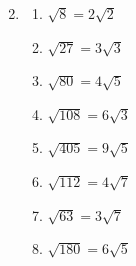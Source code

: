 \documentclass[a4paper,12pt]{article}
\begin{document}
\begin{enumerate}
\begin{multicols}{2}
	\end{multicols}
	\item 
	\begin{multicols}{2}
		\begin{enumerate}
			\item $\displaystyle \sqrt{8}=2\sqrt{2}$
			\item $\displaystyle \sqrt{27}=3\sqrt{3}$
			\item $\displaystyle \sqrt{80}=4\sqrt{5}$
			\item $\displaystyle \sqrt{108}=6\sqrt{3}$
			\item $\displaystyle \sqrt{405}=9\sqrt{5}$
			\item $\displaystyle \sqrt{112}=4\sqrt{7}$
			\item $\displaystyle \sqrt{63}=3\sqrt{7}$
			\item $\displaystyle \sqrt{180}=6\sqrt{5}$
		\end{enumerate}
	\end{multicols}
\end{enumerate}
\normalsize







 
\end{document}
